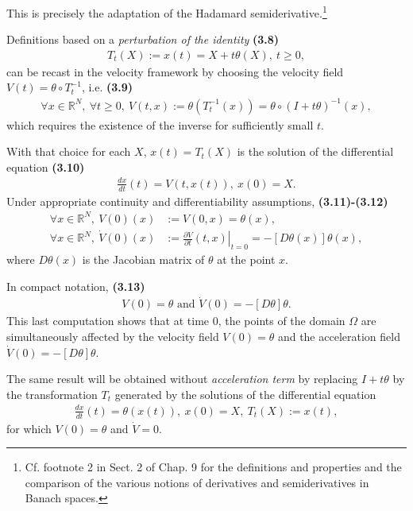 \documentclass{book}
\numberwithin{equation}{section}
\begin{document}
\begin{enumerate}
    This is precisely the adaptation of the Hadamard semiderivative.\footnote{Cf. footnote 2 in Sect. 2 of Chap. 9 for the definitions and properties and the comparison of the various notions of derivatives and semiderivatives in Banach spaces.}
    
    Definitions based on a \textit{perturbation of the identity} \textbf{(3.8)}
    \begin{align*}
        T_t(X) := x(t) = X + t\theta(X),\ t\ge 0,
    \end{align*}
    can be recast in the velocity framework by choosing the velocity field $V(t) = \theta\circ T_t^{-1}$, i.e. \textbf{(3.9)}
    \begin{align*}
        \forall x\in\mathbb{R}^N,\ \forall t\ge 0,\ V(t,x) := \theta\left(T_t^{-1}(x)\right) = \theta\circ\left(I + t\theta\right)^{-1}(x),
    \end{align*}
    which requires the existence of the inverse for sufficiently small $t$.
    
    With that choice for each $X$, $x(t) = T_t(X)$ is the solution of the differential equation \textbf{(3.10)}
    \begin{align*}
        \frac{dx}{dt}(t) = V\left(t,x(t)\right),\ x(0) = X.
    \end{align*}
    Under appropriate continuity and differentiability assumptions, \textbf{(3.11)-(3.12)}
    \begin{align*}
        \forall x\in\mathbb{R}^N,\ V(0)(x) &:= V(0,x) = \theta(x),\\
        \forall x\in\mathbb{R}^N,\ \dot{V}(0)(x) &:= \left.\frac{\partial V}{\partial t}(t,x)\right|_{t=0} = - \left[D\theta(x)\right]\theta(x),
    \end{align*}
    where $D\theta(x)$ is the Jacobian matrix of $\theta$ at the point $x$.
    
    In compact notation, \textbf{(3.13)}
    \begin{align*}
        V(0) = \theta \mbox{ and } \dot{V}(0) = -[D\theta]\theta.
    \end{align*}
    This last computation shows that at time 0, the points of the domain $\Omega$ are simultaneously affected by the velocity field $V(0) = \theta$ and the acceleration field $\dot{V}(0) = -[D\theta]\theta$.
    
    The same result will be obtained without \textit{acceleration term} by replacing $I + t\theta$ by the transformation $T_t$ generated by the solutions of the differential equation
    \begin{align*}
        \frac{dx}{dt}(t) = \theta(x(t)),\ x(0) = X,\ T_t(X) := x(t),
    \end{align*}
    for which $V(0) = \theta$ and $\dot{V} = 0$.
    

\end{enumerate}
\end{document}
